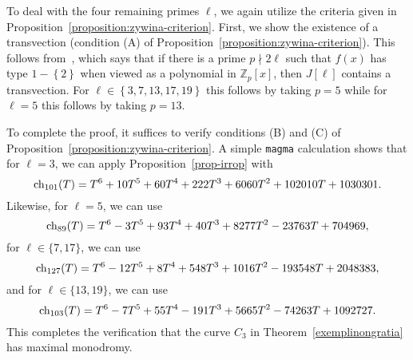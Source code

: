 To deal with the four remaining primes $\ell$, we again utilize the criteria given in Proposition~\ref{proposition:zywina-criterion}. 
First, we show the existence of a transvection (condition (A) of Proposition~\ref{proposition:zywina-criterion}). 
This follows from~\cite[Lemma 2.9]{anni2017constructing}, which says that if there is a prime $p \nmid 2 \ell$ such that $f(x)$ has type $1 - \left\{ 2 \right\}$ when viewed as a polynomial in $\mathbb Z_p[x]$, then $J[\ell]$ contains a transvection.
For $\ell \in \left\{ 3, 7,13,17,19 \right\}$ this follows by taking $p = 5$ while for $\ell =5$ this follows by taking $p = 13$.

To complete the proof, it suffices to verify conditions (B) and (C) of Proposition~\ref{proposition:zywina-criterion}. A simple {\tt magma} calculation shows that for $\ell = 3$, we can apply Proposition~\ref{prop-irrop} with
$$\operatorname{ch}_{101}(T) = T^6 + 10T^5 + 60T^4 + 222T^3 + 6060T^2 + 102010T + 1030301.$$
Likewise, for $\ell = 5$, we can use
$$\operatorname{ch}_{89}(T) = T^6 - 3T^5 + 93T^4 + 40T^3 + 8277T^2 - 23763T + 704969,$$
for $\ell \in \{7, 17\}$, we can use 
$$\operatorname{ch}_{127}(T) = T^6 - 12T^5 + 8T^4 + 548T^3 + 1016T^2 - 193548T + 2048383,$$
and for $\ell \in \{13,19\}$, we can use
$$\operatorname{ch}_{103}(T) = T^6 - 7T^5 + 55T^4 - 191T^3 + 5665T^2 - 74263T + 1092727
.$$
This completes the verification that the curve $C_3$ in Theorem~\ref{exemplinongratia} has maximal monodromy.


